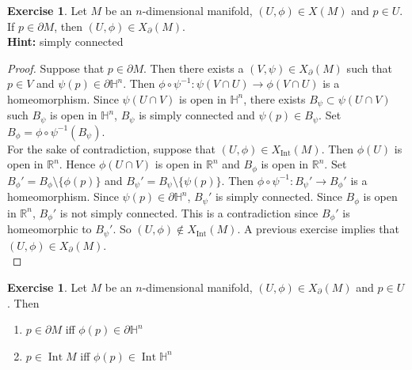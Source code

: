 \documentclass[12pt]{amsart}
\theoremstyle{definition}
\newtheorem{ex}[definition]{Exercise}
\renewcommand{\H}{\mathbb{H}}
\newcommand{\R}{\mathbb{R}}
\newcommand{\p}{\partial}
\DeclareMathOperator{\Int}{Int}
\begin{document}
	\begin{ex}
		Let $M$ be an $n$-dimensional manifold, $(U, \phi) \in X(M)$ and $p \in U$. If $p \in \partial M$, then $(U, \phi) \in X_{\p}(M)$. \\
		\textbf{Hint:} simply connected
	\end{ex}

	\begin{proof}
		Suppose that $p \in \partial M$. Then there exists a $(V, \psi) \in X_{\p}(M)$ such that $p \in V$ and $\psi(p) \in \partial \H^n$. Then $\phi \circ \psi^{-1} : \psi(V \cap U) \rightarrow \phi(V \cap U)$ is a homeomorphism. Since $\psi(U \cap V)$ is open in $\H^n$, there exists $B_{\psi} \subset \psi(U \cap V)$ such $B_{\psi}$ is open in $\H^n$, $B_{\psi}$ is simply connected and $\psi(p) \in B_{\psi}$. Set $B_{\phi} = \phi \circ \psi^{-1}(B_{\psi})$. \\
		For the sake of contradiction, suppose that $(U, \phi) \in X_{\Int}(M)$. Then $\phi(U)$ is open in $\R^n$. Hence $\phi(U \cap V)$ is open in $\R^n$ and $B_{\phi}$ is open in $\R^n$. Set $B_{\phi}' = B_{\phi} \setminus \{\phi(p)\}$ and $B_{\psi}' = B_{\psi} \setminus \{\psi(p)\}$. Then $\phi \circ \psi^{-1}: B_{\psi}' \rightarrow B_{\phi}'$ is a homeomorphism. Since $\psi(p) \in \p \H^n$, $B_{\psi}'$ is simply connected. Since $B_{\phi}$ is open in $\R^n$, $B_{\phi}'$ is not simply connected. This is a contradiction since $B_{\phi}'$ is homeomorphic to $B_{\psi}'$. So $(U, \phi) \not \in X_{\Int}(M)$. A previous exercise implies that $(U, \phi) \in X_{\p}(M)$.\\
	\end{proof}

	\begin{ex}
		Let $M$ be an $n$-dimensional manifold, $(U, \phi) \in X_{\p}(M)$ and $p \in U$. Then 
		\begin{enumerate}
			\item $p \in \p M$ iff $\phi(p) \in \p \H^n$
			\item $p \in \Int M$ iff $\phi(p) \in \Int \H^n$
		\end{enumerate}
	\end{ex}
\end{document}
